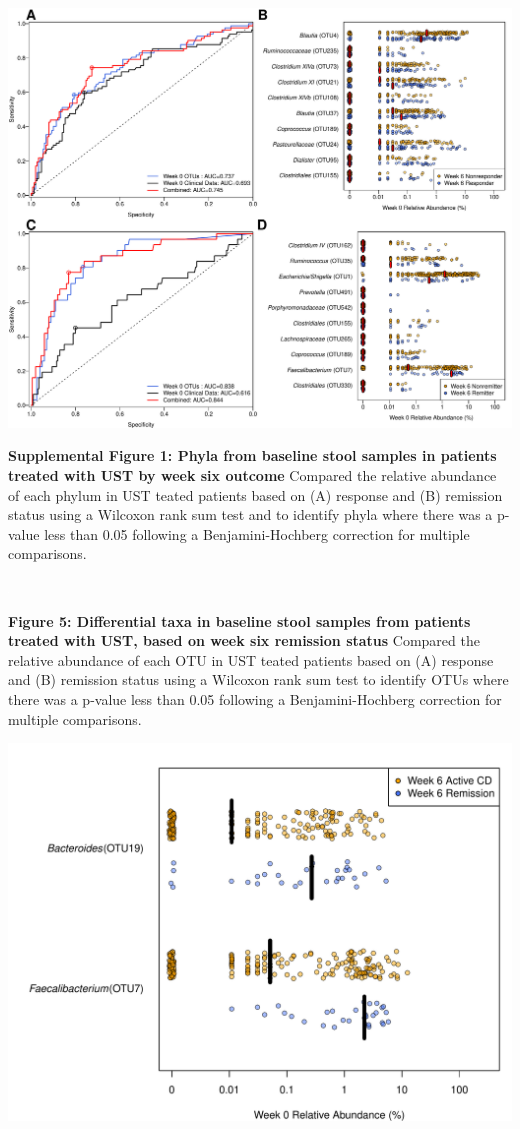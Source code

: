 \documentclass[11pt,]{article}
\begin{document}
\includegraphics{figures/Figure4_wk0Xwk6pred.pdf}

\newpage

\textbf{Supplemental Figure 1: Phyla from baseline stool samples in
patients treated with UST by week six outcome} Compared the relative
abundance of each phylum in UST teated patients based on (A) response
and (B) remission status using a Wilcoxon rank sum test and to identify
phyla where there was a p-value less than 0.05 following a
Benjamini-Hochberg correction for multiple comparisons.

\includegraphics{figures/SF1_wk6phyla.pdf}

\newpage

\textbf{Figure 5: Differential taxa in baseline stool samples from
patients treated with UST, based on week six remission status} Compared
the relative abundance of each OTU in UST teated patients based on (A)
response and (B) remission status using a Wilcoxon rank sum test to
identify OTUs where there was a p-value less than 0.05 following a
Benjamini-Hochberg correction for multiple comparisons.

\includegraphics{figures/Figure5_basesigOTUabund.REMISSwk6.pdf}
\end{document}
